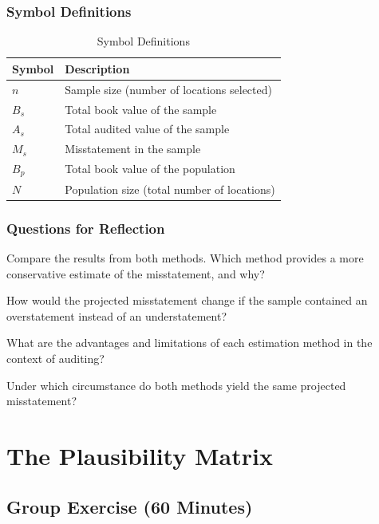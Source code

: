 \documentclass[12pt,a4paper]{memoir}
\begin{document}
\subsection*{Symbol Definitions}
\begin{table}[htbp]
\centering
\caption{Symbol Definitions}
\label{tab:symbol_definitions}
\begin{tabularx}{\textwidth}{@{}lX@{}}
\toprule
\textbf{Symbol} & \textbf{Description} \\
\midrule
$n$ & Sample size (number of locations selected) \\
$B_s$ & Total book value of the sample \\
$A_s$ & Total audited value of the sample \\
$M_s$ & Misstatement in the sample \\
$B_p$ & Total book value of the population \\
$N$ & Population size (total number of locations) \\
\bottomrule
\end{tabularx}
\end{table}

\subsection*{Questions for Reflection}
\begin{compactitem}
    \item Compare the results from both methods. Which method provides a more conservative estimate of the misstatement, and why?
    \item How would the projected misstatement change if the sample contained an overstatement instead of an understatement?
    \item What are the advantages and limitations of each estimation method in the context of auditing?
    \item Under which circumstance do both methods yield the same projected misstatement?
\end{compactitem}

\chapter{The Plausibility Matrix}

\section*{Group Exercise (60 Minutes)}
\end{document}
